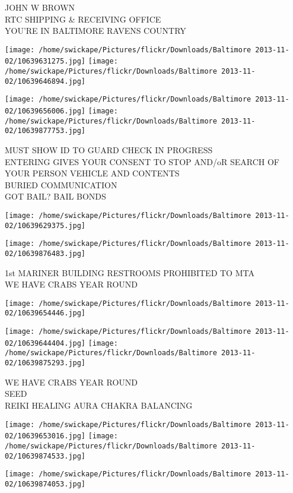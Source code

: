 \documentclass[10pt,letterpaper]{article}
\begin{document}
JOHN W BROWN\\
RTC SHIPPING \& RECEIVING OFFICE\\
YOU'RE IN BALTIMORE RAVENS COUNTRY
\pagebreak

\texttt{[image: /home/swickape/Pictures/flickr/Downloads/Baltimore 2013-11-02/10639631275.jpg]}
\texttt{[image: /home/swickape/Pictures/flickr/Downloads/Baltimore 2013-11-02/10639646894.jpg]}

\texttt{[image: /home/swickape/Pictures/flickr/Downloads/Baltimore 2013-11-02/10639656006.jpg]}
\texttt{[image: /home/swickape/Pictures/flickr/Downloads/Baltimore 2013-11-02/10639877753.jpg]}

MUST SHOW ID TO GUARD CHECK IN PROGRESS\\
ENTERING GIVES YOUR CONSENT TO STOP AND/oR SEARCH OF YOUR PERSON VEHICLE AND CONTENTS\\
BURIED COMMUNICATION\\
GOT BAIL?  BAIL BONDS
\pagebreak

\texttt{[image: /home/swickape/Pictures/flickr/Downloads/Baltimore 2013-11-02/10639629375.jpg]}

\vspace{0.25in}
\texttt{[image: /home/swickape/Pictures/flickr/Downloads/Baltimore 2013-11-02/10639876483.jpg]}

1st MARINER BUILDING RESTROOMS PROHIBITED TO MTA\\
WE HAVE CRABS YEAR ROUND
\pagebreak

\texttt{[image: /home/swickape/Pictures/flickr/Downloads/Baltimore 2013-11-02/10639654446.jpg]}

\vspace{0.25in}
\texttt{[image: /home/swickape/Pictures/flickr/Downloads/Baltimore 2013-11-02/10639644404.jpg]}
\texttt{[image: /home/swickape/Pictures/flickr/Downloads/Baltimore 2013-11-02/10639875293.jpg]}

WE HAVE CRABS YEAR ROUND\\
SEED\\
REIKI HEALING AURA CHAKRA BALANCING
\pagebreak

\texttt{[image: /home/swickape/Pictures/flickr/Downloads/Baltimore 2013-11-02/10639653016.jpg]}
\texttt{[image: /home/swickape/Pictures/flickr/Downloads/Baltimore 2013-11-02/10639874533.jpg]}

\vspace{0.25in}
\texttt{[image: /home/swickape/Pictures/flickr/Downloads/Baltimore 2013-11-02/10639874053.jpg]}
\end{document}
